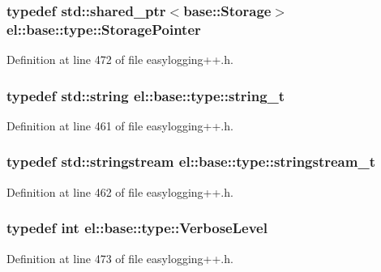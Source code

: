 \subsubsection[{Storage\+Pointer}]{\setlength{\rightskip}{0pt plus 5cm}typedef std\+::shared\+\_\+ptr$<${\bf base\+::\+Storage}$>$ {\bf el\+::base\+::type\+::\+Storage\+Pointer}}\label{namespaceel_1_1base_1_1type_a3c34822c3825018aca1526f2289b7976}


Definition at line 472 of file easylogging++.\+h.

\hypertarget{namespaceel_1_1base_1_1type_a67e406cd213c231f1d135b5a4eda64b5}{}
\subsubsection[{string\+\_\+t}]{\setlength{\rightskip}{0pt plus 5cm}typedef std\+::string {\bf el\+::base\+::type\+::string\+\_\+t}}\label{namespaceel_1_1base_1_1type_a67e406cd213c231f1d135b5a4eda64b5}


Definition at line 461 of file easylogging++.\+h.

\hypertarget{namespaceel_1_1base_1_1type_a3492908c4b80f97b6c4b346d394f1302}{}
\subsubsection[{stringstream\+\_\+t}]{\setlength{\rightskip}{0pt plus 5cm}typedef std\+::stringstream {\bf el\+::base\+::type\+::stringstream\+\_\+t}}\label{namespaceel_1_1base_1_1type_a3492908c4b80f97b6c4b346d394f1302}


Definition at line 462 of file easylogging++.\+h.

\hypertarget{namespaceel_1_1base_1_1type_a3f79fa74639a13c32f794ba074fe7fb4}{}
\subsubsection[{Verbose\+Level}]{\setlength{\rightskip}{0pt plus 5cm}typedef int {\bf el\+::base\+::type\+::\+Verbose\+Level}}\label{namespaceel_1_1base_1_1type_a3f79fa74639a13c32f794ba074fe7fb4}


Definition at line 473 of file easylogging++.\+h.

